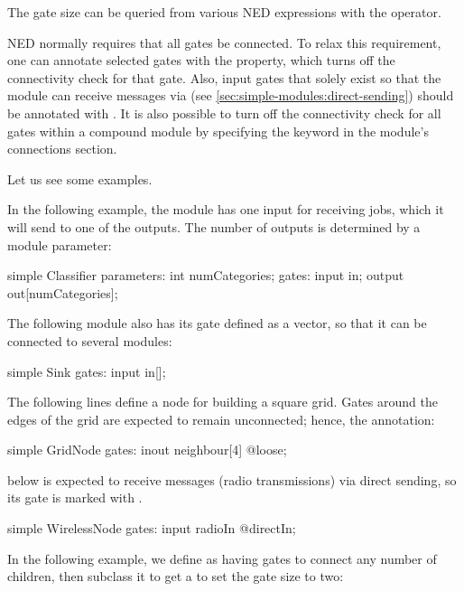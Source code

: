 The gate size can be queried from various NED expressions with the
 operator.

NED normally requires that all gates be connected. To relax this
requirement, one can annotate selected gates with the 
property, which turns off the connectivity check for that gate. Also, input
gates that solely exist so that the module can receive messages via
 (see \ref{sec:simple-modules:direct-sending}) should
be annotated with . It is also possible to turn off the connectivity
check for all gates within a compound module by specifying the
 keyword in the module's connections section.

Let us see some examples.

In the following example, the  module has one input for
receiving jobs, which it will send to one of the outputs. The number of
outputs is determined by a module parameter:

\begin{ned}
simple Classifier {
    parameters:
        int numCategories;
    gates:
        input in;
        output out[numCategories];
}
\end{ned}

The following  module also has its  gate defined
as a vector, so that it can be connected to several modules:

\begin{ned}
simple Sink {
    gates:
        input in[];
}
\end{ned}

The following lines define a node for building a square grid. Gates around
the edges of the grid are expected to remain unconnected; hence, the
 annotation:

\begin{ned}
simple GridNode {
    gates:
        inout neighbour[4] @loose;
}
\end{ned}

 below is expected to receive messages (radio transmissions)
via direct sending, so its  gate is marked with .

\begin{ned}
simple WirelessNode {
    gates:
        input radioIn @directIn;
}
\end{ned}

In the following example, we define  as having gates to connect
any number of children, then subclass it to get a  to
set the gate size to two:


